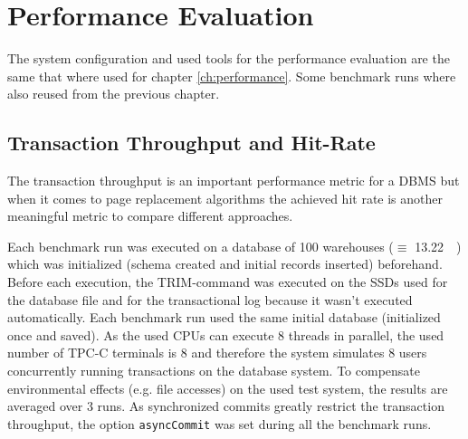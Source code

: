 %
%
%

\section{Performance Evaluation}

    The system configuration and used tools for the performance evaluation are the same that where used for chapter \ref{ch:performance}. Some benchmark runs where also reused from the previous chapter.

\subsection{Transaction Throughput and Hit-Rate} \label{subsec:throughputandhitrate}

    The transaction throughput is an important performance metric for a DBMS but when it comes to page replacement algorithms the achieved hit rate is another meaningful metric to compare different approaches. 

    Each benchmark run was executed on a database of 100 warehouses ($\equiv$ \SI{13.22}{\gibi\byte}) which was initialized (schema created and initial records inserted) beforehand. Before each execution, the TRIM-command was executed on the SSDs used for the database file and for the transactional log because it wasn't executed automatically. Each benchmark run used the same initial database (initialized once and saved). As the used CPUs can execute 8 threads in parallel, the used number of TPC-C terminals is 8 and therefore the system simulates 8 users concurrently running transactions on the database system. To compensate environmental effects (e.g. file accesses) on the used test system, the results are averaged over 3 runs. As synchronized commits greatly restrict the transaction throughput, the option \lstinline{asyncCommit} was set during all the benchmark runs.

